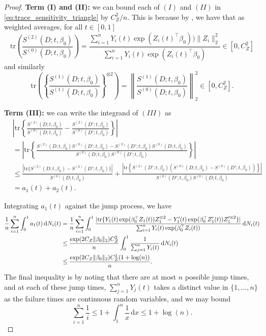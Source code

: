 \documentclass[11pt]{article}
\newcommand{\dint}{\,\mathrm{d}}
\begin{document}
\begin{proof}
\medskip
\noindent \textbf{Term (I) and (II):} we can bound each of $(I)$ and $(II)$ in \eqref{eq:trace_sensitivity_triangle} by $C_Z^2/n$. This is because by , we have that as weighted averages, for all $t \in [0, 1]$
\begin{equation}
    \mathrm{tr} \left(\frac{S^{(2)}(D; t, \beta_0)}{S^{(0)}(D; t, \beta_0)} \right) =  \frac{\sum_{i=1}^n Y_i(t) \exp(Z_i(t)^\top \beta_0)) \|Z_i\|_2^2}{\sum_{i=1}^n Y_i(t) \exp(Z_i(t)^\top \beta_0)}   \in [0, C_Z^2]
    \label{eq:deg2_bound}
\end{equation}
and similarly 
\begin{equation}
     \mathrm{tr} \left( \left\{\frac{S^{(1)}(D; t, \beta_0)}{S^{(1)}(D; t, \beta_0)} \right\}^{\otimes 2} \right) = 
     \left\|\frac{S^{(1)}(D; t, \beta_0)}{S^{(0)}(D; t, \beta_0)}\right\|_2^2 \in [0, C_Z^2].
     \label{eq:deg1_bound}
\end{equation}

\medskip
\noindent \textbf{Term (III):} we can write the integrand of $(III)$ as 
\begin{align*}
    & \left|\mathrm{tr} \left\{\frac{S^{(2)}(D; t, \beta_0)}{S^{(0)}(D; t, \beta_0)} - \frac{S^{(2)}(D'; t, \beta_0)}{S^{(0)}(D'; t, \beta_0)} \right\} \right| \\
    & = \left|\mathrm{tr} \left\{\frac{S^{(2)}(D; t, \beta_0)S^{(0)}(D'; t, \beta_0) - S^{(2)}(D'; t, \beta_0) S^{(0)}(D; t, \beta_0)}{S^{(0)}(D; t, \beta_0)S^{(0)}(D'; t, \beta_0)} \right\} \right| \\
    &\leq \frac{ |\mathrm{tr} \{S^{(2)}(D; t, \beta_0) - S^{(2)}(D'; t, \beta_0)\}|}{S^{(0)}(D; t, \beta_0)} + \frac{ \left|\mathrm{tr} \left\{S^{(2)}(D'; t, \beta_0) \left(S^{(0)}(D; t, \beta_0) - S^{(0)}(D'; t, \beta_0)\right) \right\} \right|}{S^{(0)}(D'; t, \beta_0) S^{(0)}(D;t, \beta_0)} \\
    &=a_1(t) + a_2(t).
\end{align*}

Integrating $a_1(t)$ against the jump process, we have 
\begin{align}
    \frac{1}{n} \sum_{i=1
    }^n \int_0^1 a_1(t) \dint N_i(t) &= \frac{1}{n} \sum_{i=1
    }^n \int_0^1 \frac{ |\mathrm{tr} \{Y_1(t) \exp(\beta_0^\top Z_1(t))Z_1^{\otimes 2} - Y_1'(t) \exp(\beta_0^\top Z_1'(t)) Z_1'^{\otimes 2}\}|}{\sum_{i=1}^n Y_i(t) \exp(\beta_0^\top Z_i(t))} \dint N_i(t) \notag \\
    &\leq \frac{\exp(2C_Z \|\beta_0\|_2)C_Z^2}{n} \int_0^1 \frac{1}{\sum_{j=1}^n Y_i(t)} \dint N_i(t) \notag \\
    &\leq \frac{\exp(2C_Z\|\beta_0\|_2)C_Z^2(1 + \log (n))}{n}.
    \label{eq:sens_log_example}
\end{align}
The final inequality is by noting that there are at most $n$ possible jump times, and at each of these jump times, $\sum_{j=1}^n Y_j(t)$ takes a distinct value in $\{1, \dots, n\}$ as the failure times are continuous random variables, and we may bound 
\begin{equation*}
    \sum_{i=1}^n \frac{1}{i} \leq 1 + \int_1^{n} \frac{1}{x} \dint x \leq 1 + \log(n).
\end{equation*}


\end{proof}
\end{document}
